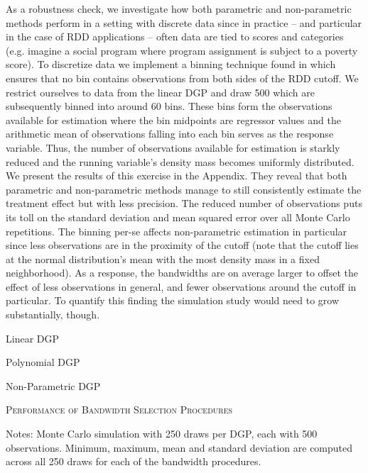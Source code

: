 \documentclass[11pt, a4paper, leqno]{article}
\numberwithin{equation}{section}
\numberwithin{figure}{section}
\numberwithin{table}{section}
\numberwithin{algorithm}{section}
\begin{document}
As a robustness check, we investigate how both parametric and non-parametric methods perform in a setting with discrete data since in practice -- and particular in the case of RDD applications -- often data are tied to scores and categories (e.g. imagine a social program where program assignment is subject to a poverty score). To discretize data we implement a binning technique found in \cite{mccrary_2008} which ensures that no bin contains observations from both sides of the RDD cutoff. We restrict ourselves to data from the linear DGP and draw 500 which are subsequently binned into around 60 bins. These bins form the observations available for estimation where the bin midpoints are regressor values and the arithmetic mean of observations falling into each bin serves as the response variable. Thus, the number of observations available for estimation is starkly reduced and the running variable's density mass becomes uniformly distributed. We present the results of this exercise in the Appendix. They reveal that both parametric and non-parametric methods manage to still consistently estimate the treatment effect but with less precision. The reduced number of observations puts its toll on the standard deviation and mean squared error over all Monte Carlo repetitions. The binning per-se affects non-parametric estimation in particular since less observations are in the proximity of the cutoff (note that the cutoff lies at the normal distribution's mean with the most density mass in a fixed neighborhood). As a response, the bandwidths are on average larger to offset the effect of less observations in general, and fewer observations around the cutoff in particular. To quantify this finding the simulation study would need to grow substantially, though.

\begin{table}[H]
	\begin{subtable}{\textwidth}
		\centering
		
		\caption{Linear DGP}
		\label{tab: bw_perf_linear}
		\hspace{\fill}
	\end{subtable}
	\begin{subtable}{\textwidth}
		\centering
		
		\caption{Polynomial DGP}
		\label{tab: bw_perf_poly}
		\hspace{\fill}
	\end{subtable}
	\begin{subtable}{\textwidth}
		\centering
		
		\caption{Non-Parametric DGP}
		\label{tab: bw_perf_nonparam}
	\end{subtable}
	\caption{\textsc{Performance of Bandwidth Selection Procedures}}
	\label{tab: bw_perf}
	\medskip
	\justify
	\footnotesize{Notes: Monte Carlo simulation with 250 draws per DGP, each with 500 observations. Minimum, maximum, mean and standard deviation are computed across all 250 draws for each of the bandwidth procedures.}
\end{table}
\end{document}

